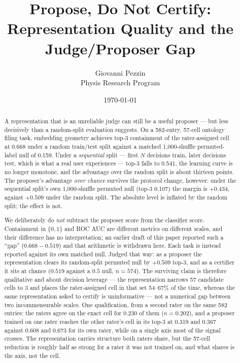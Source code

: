 \documentclass[11pt]{article}
\title{Propose, Do Not Certify: Representation Quality and the Judge/Proposer Gap}
\author{Giovanni Pezzin \\ Physis Research Program}
\date{\today}
\begin{document}
\maketitle

\begin{abstract}
A representation that is an unreliable judge can still be a useful proposer
--- but less decisively than a random-split evaluation suggests. On a
582-entry, 57-cell ontology filing task, embedding geometry achieves top-3
containment of the rater-assigned cell at 0.668 under a random train/test
split against a matched 1{,}000-shuffle permuted-label null of 0.159. Under
a \emph{sequential} split --- first $N$ decisions train, later decisions
test, which is what a real user experiences --- top-3 falls to 0.541, the
learning curve is no longer monotone, and the advantage over the random
split is about thirteen points. The proposer's advantage \emph{over chance}
survives the protocol change, however: under the sequential split's own
1{,}000-shuffle permuted null (top-3 0.107) the margin is $+0.434$, against
$+0.509$ under the random split. The absolute level is inflated by the
random split; the effect is not.

We deliberately do \emph{not} subtract the proposer score from the
classifier score. Containment in $\{0,1\}$ and ROC AUC are different metrics
on different scales, and their difference has no interpretation; an earlier
draft of this paper reported such a ``gap'' ($0.668-0.519$) and that
arithmetic is withdrawn here. Each task is instead reported against its own
matched null. Judged that way: as a proposer the representation clears its
random-split permuted null by $+0.509$ top-3, and as a certifier it sits at
chance ($0.519$ against a $0.5$ null, $n=574$). The surviving claim is
therefore qualitative and about decision leverage --- the representation
narrows 57 candidate cells to 3 and places the rater-assigned cell in that set
54--67\% of the time, whereas the same representation asked to certify is
uninformative --- not a numerical gap between two incommensurable scales.
One qualification, from a second rater on the same 582 entries: the raters
agree on the exact cell for 0.230 of them ($\kappa = 0.202$), and a proposer
trained on one rater reaches the other rater's cell in its top-3 at 0.319 and
0.367 against 0.608 and 0.673 for its own rater, while on a single axis most
of the signal crosses. The representation carries
structure both raters share, but the 57-cell reduction is roughly half as
strong for a rater it was not trained on, and what shares is the axis, not
the cell.
\end{abstract}
\end{document}
